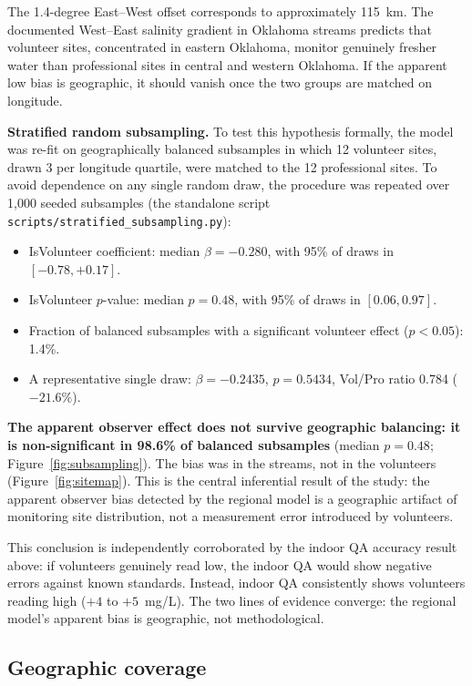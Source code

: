 \documentclass[lineno]{wlpeerj}
\begin{document}
The 1.4-degree East--West offset corresponds to approximately 115~km. The documented West--East salinity gradient in Oklahoma streams \citep{Dyer2025} predicts that volunteer sites, concentrated in eastern Oklahoma, monitor genuinely fresher water than professional sites in central and western Oklahoma. If the apparent low bias is geographic, it should vanish once the two groups are matched on longitude.

\textbf{Stratified random subsampling.} To test this hypothesis formally, the model was re-fit on geographically balanced subsamples in which 12 volunteer sites, drawn 3 per longitude quartile, were matched to the 12 professional sites. To avoid dependence on any single random draw, the procedure was repeated over 1{,}000 seeded subsamples (the standalone script \texttt{scripts/stratified\_subsampling.py}):

\begin{itemize}
  \item IsVolunteer coefficient: median $\beta = -0.280$, with 95\% of draws in $[-0.78, +0.17]$.
  \item IsVolunteer $p$-value: median $p = 0.48$, with 95\% of draws in $[0.06, 0.97]$.
  \item Fraction of balanced subsamples with a significant volunteer effect ($p < 0.05$): 1.4\%.
  \item A representative single draw: $\beta = -0.2435$, $p = 0.5434$, Vol/Pro ratio 0.784 ($-21.6\%$).
\end{itemize}

\textbf{The apparent observer effect does not survive geographic balancing: it is non-significant in 98.6\% of balanced subsamples} (median $p = 0.48$; Figure~\ref{fig:subsampling}). The bias was in the streams, not in the volunteers (Figure~\ref{fig:sitemap}). This is the central inferential result of the study: the apparent observer bias detected by the regional model is a geographic artifact of monitoring site distribution, not a measurement error introduced by volunteers.

This conclusion is independently corroborated by the indoor QA accuracy result above: if volunteers genuinely read low, the indoor QA would show negative errors against known standards. Instead, indoor QA consistently shows volunteers reading high ($+4$ to $+5$~mg/L). The two lines of evidence converge: the regional model's apparent bias is geographic, not methodological.

\subsection{Geographic coverage}
\label{sec:coverage}
\end{document}

